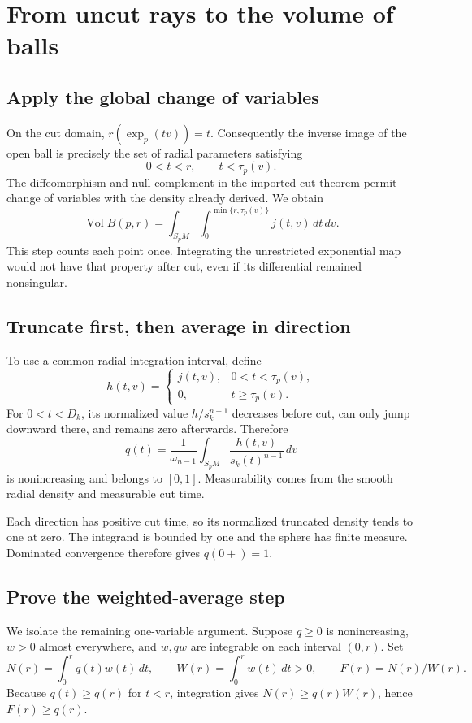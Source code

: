 \documentclass[12pt,reqno]{amsart}
\begin{document}
\section{From uncut rays to the volume of balls}
\label{sec:integration}

\subsection{Apply the global change of variables}
On the cut domain, \(r(\exp_p(tv))=t\). Consequently the inverse image of the open ball is precisely the set of radial parameters satisfying
\[
0<t<r,\qquad t<\tau_p(v).
\]
The diffeomorphism and null complement in the imported cut theorem permit change of variables with the density already derived. We obtain
\[
\operatorname{Vol}B(p,r)=\int_{S_pM}\int_0^{\min\{r,\tau_p(v)\}}j(t,v)\,dt\,dv.
\]
This step counts each point once. Integrating the unrestricted exponential map would not have that property after cut, even if its differential remained nonsingular.

\subsection{Truncate first, then average in direction}
To use a common radial integration interval, define
\[
h(t,v)=\begin{cases}j(t,v),&0<t<\tau_p(v),\\0,&t\ge\tau_p(v).\end{cases}
\]
For \(0<t<D_k\), its normalized value \(h/s_k^{n-1}\) decreases before cut, can only jump downward there, and remains zero afterwards. Therefore
\[
q(t)=\frac1{\omega_{n-1}}\int_{S_pM}\frac{h(t,v)}{s_k(t)^{n-1}}\,dv
\]
is nonincreasing and belongs to \([0,1]\). Measurability comes from the smooth radial density and measurable cut time.

Each direction has positive cut time, so its normalized truncated density tends to one at zero. The integrand is bounded by one and the sphere has finite measure. Dominated convergence therefore gives \(q(0+)=1\).

\subsection{Prove the weighted-average step}
We isolate the remaining one-variable argument. Suppose \(q\ge0\) is nonincreasing, \(w>0\) almost everywhere, and \(w,qw\) are integrable on each interval \((0,r)\). Set
\[
N(r)=\int_0^r q(t)w(t)\,dt,\qquad
W(r)=\int_0^r w(t)\,dt>0,\qquad F(r)=N(r)/W(r).
\]
Because \(q(t)\ge q(r)\) for \(t<r\), integration gives \(N(r)\ge q(r)W(r)\), hence \(F(r)\ge q(r)\).
\end{document}

